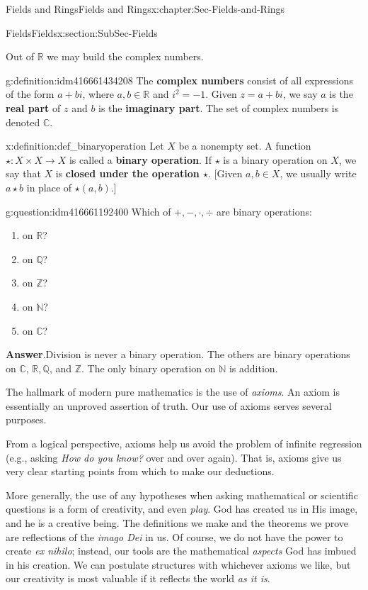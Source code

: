 \documentclass[oneside,10pt,]{book}
\newcommand{\terminology}[1]{\textbf{#1}}
\numberwithin{equation}{section}
\def\C{{\mathbb C}}
\def\Z{{\mathbb Z}}
\def\Q{{\mathbb Q}}
\def\N{{\mathbb N}}
\def\R{{\mathbb R}}
\begin{document}
\begin{chapterptx}{Fields and Rings}{}{Fields and Rings}{}{}{x:chapter:Sec-Fields-and-Rings}
\begin{sectionptx}{Fields}{}{Fields}{}{}{x:section:SubSec-Fields}
\par
Out of \(\R\) we may build the complex numbers.%
\begin{definition}{}{g:definition:idm416661434208}%
The \terminology{complex numbers} consist of all expressions of the form \(a+bi\), where \(a,b\in \R\) and \(i^2 = -1\). Given \(z = a+bi\), we say \(a\) is the \terminology{real part} of \(z\) and \(b\) is the \terminology{imaginary part}. The set of complex numbers is denoted \(\C\).%
\end{definition}
\begin{definition}{}{x:definition:def_binaryoperation}%
 Let \(X\) be a nonempty set. A function \(\star : X \times X \to X\) is called a \terminology{binary operation}. If \(\star\) is a binary operation on \(X\), we say that \(X\) is \terminology{closed under the operation \(\star\)}. [Given \(a,b\in X\), we usually write \(a\star b\) in place of \(\star(a,b)\).]%
\end{definition}
\begin{question}{}{g:question:idm416661192400}%
Which of \(+, -, \cdot, \div\) are binary operations:%
\begin{enumerate}
\item{}on \(\R\)?%
\item{}on \(\Q\)?%
\item{}on \(\Z\)?%
\item{}on \(\N\)?%
\item{}on \(\C\)?%
\end{enumerate}
%
\par\smallskip%
\noindent\textbf{Answer}.\hypertarget{g:answer:idm416661048464}{}\quad{}Division is never a binary operation. The others are binary operations on \(\C\), \(\R, \Q\), and \(\Z\). The only binary operation on \(\N\) is addition.%
\end{question}
The hallmark of modern pure mathematics is the use of \emph{axioms}. An axiom is essentially an unproved assertion of truth. Our use of axioms serves several purposes.%
\par
From a logical perspective, axioms help us avoid the problem of infinite regression (e.g., asking \emph{How do you know?} over and over again). That is, axioms give us very clear starting points from which to make our deductions.%
\par
More generally, the use of any hypotheses when asking mathematical or scientific questions is a form of creativity, and even \emph{play}. God has created us in His image, and he is a creative being. The definitions we make and the theorems we prove are reflections of the \emph{imago Dei} in us. Of course, we do not have the power to create \emph{ex nihilo}; instead, our tools are the mathematical \emph{aspects} God has imbued in his creation. We can postulate structures with whichever axioms we like, but our creativity is most valuable if it reflects the world \emph{as it is}.%

\end{sectionptx}
\end{chapterptx}
\end{document}
